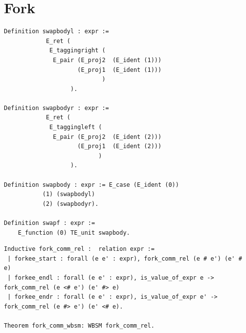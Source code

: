 \documentclass[12pt,twoside,notitlepage]{report}
\theoremstyle{plain}%
\theoremstyle{definition}
\theoremstyle{remark}
\begin{document}
\section{Fork}
\begin{minipage}{\linewidth}
\begin{lstlisting}[language={Coq}, caption={The original Coq $\mathit{swapf}$ function}, label={lst:orig_coq_swapf},numbersep=11pt]
Definition swapbodyl : expr :=
            E_ret (  
             E_taggingright (
              E_pair (E_proj2  (E_ident (1))) 
                     (E_proj1  (E_ident (1)))
                            )
                   ).

Definition swapbodyr : expr :=
            E_ret (  
             E_taggingleft (
              E_pair (E_proj2  (E_ident (2))) 
                     (E_proj1  (E_ident (2)))
                           )
                   ).

Definition swapbody : expr := E_case (E_ident (0)) 
           (1) (swapbodyl) 
           (2) (swapbodyr).

Definition swapf : expr :=
    E_function (0) TE_unit swapbody.
\end{lstlisting}
\end{minipage}
\begin{minipage}{\linewidth}
\begin{lstlisting}[language={Coq}, caption={Fork commutativity},numbersep=11pt]
Inductive fork_comm_rel :  relation expr := 
 | forkee_start : forall (e e' : expr), fork_comm_rel (e # e') (e' # e)
 | forkee_endl : forall (e e' : expr), is_value_of_expr e -> fork_comm_rel (e <# e') (e' #> e)
 | forkee_endr : forall (e e' : expr), is_value_of_expr e' -> fork_comm_rel (e #> e') (e' <# e).
 
Theorem fork_comm_wbsm: WBSM fork_comm_rel.
\end{lstlisting}
\end{minipage}
\end{document}
